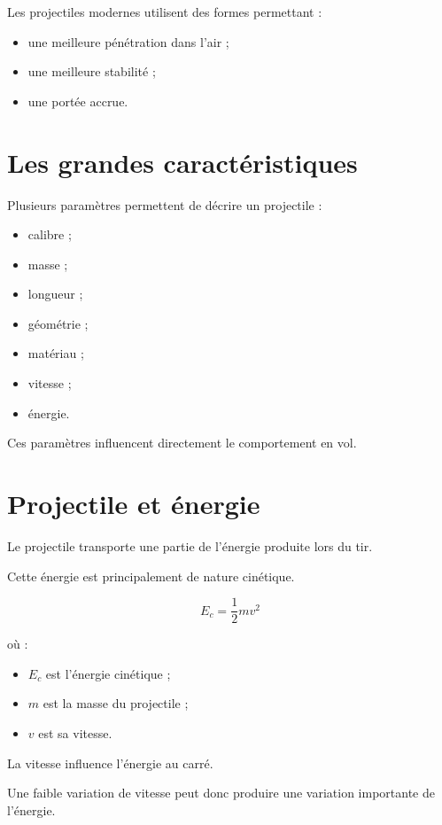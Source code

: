 Les projectiles modernes utilisent des formes permettant :

\begin{itemize}
    \item une meilleure pénétration dans l'air ;
    \item une meilleure stabilité ;
    \item une portée accrue.
\end{itemize}

\section{Les grandes caractéristiques}

Plusieurs paramètres permettent de décrire un projectile :

\begin{itemize}
    \item calibre ;
    \item masse ;
    \item longueur ;
    \item géométrie ;
    \item matériau ;
    \item vitesse ;
    \item énergie.
\end{itemize}

Ces paramètres influencent directement le comportement en vol.

\section{Projectile et énergie}

Le projectile transporte une partie de l'énergie produite lors du tir.

Cette énergie est principalement de nature cinétique.

\begin{equation}
E_c = \frac{1}{2}mv^2
\end{equation}

où :

\begin{itemize}
    \item $E_c$ est l'énergie cinétique ;
    \item $m$ est la masse du projectile ;
    \item $v$ est sa vitesse.
\end{itemize}

\begin{aretenir}

La vitesse influence l'énergie au carré.

Une faible variation de vitesse peut donc produire une variation importante
de l'énergie.

\end{aretenir}

